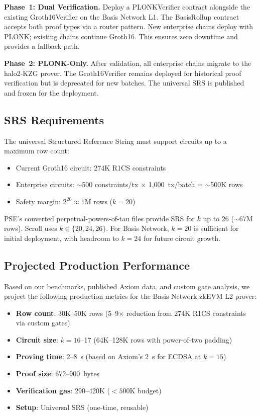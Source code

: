 \textbf{Phase~1: Dual Verification.} Deploy a PLONKVerifier
contract alongside the existing Groth16Verifier on the Basis
Network L1. The BasisRollup contract accepts both proof types
via a router pattern. New enterprise chains deploy with PLONK;
existing chains continue Groth16. This ensures zero downtime
and provides a fallback path.

\textbf{Phase~2: PLONK-Only.} After validation, all enterprise
chains migrate to the halo2-KZG prover. The Groth16Verifier
remains deployed for historical proof verification but is
deprecated for new batches. The universal SRS is published and
frozen for the deployment.

\subsection{SRS Requirements}

The universal Structured Reference String must support circuits
up to a maximum row count:

\begin{itemize}
  \item Current Groth16 circuit: 274K R1CS constraints
  \item Enterprise circuits: $\sim$500 constraints/tx $\times$
    1,000~tx/batch = $\sim$500K rows
  \item Safety margin: $2^{20} \approx 1$M rows ($k = 20$)
\end{itemize}

PSE's converted perpetual-powers-of-tau files provide SRS for
$k$ up to 26 ($\sim$67M rows). Scroll uses $k \in \{20, 24, 26\}$.
For Basis Network, $k = 20$ is sufficient for initial deployment,
with headroom to $k = 24$ for future circuit growth.

\subsection{Projected Production Performance}

Based on our benchmarks, published Axiom data, and custom gate
analysis, we project the following production metrics for the
Basis Network zkEVM L2 prover:

\begin{itemize}
  \item \textbf{Row count}: 30K--50K rows (5--9$\times$ reduction
    from 274K R1CS constraints via custom gates)
  \item \textbf{Circuit size}: $k = 16$--17 (64K--128K rows with
    power-of-two padding)
  \item \textbf{Proving time}: 2--8~s (based on Axiom's 2~s for
    ECDSA at $k = 15$)
  \item \textbf{Proof size}: 672--900~bytes
  \item \textbf{Verification gas}: 290--420K ($< 500$K budget)
  \item \textbf{Setup}: Universal SRS (one-time, reusable)
\end{itemize}

